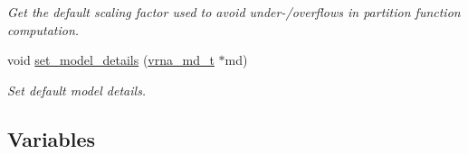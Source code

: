 \begin{DoxyCompactItemize}
\begin{DoxyCompactList}\small\item\em Get the default scaling factor used to avoid under-\//overflows in partition function computation. \end{DoxyCompactList}\item 
void \hyperlink{group__model__details_gabad896c3650d420f3f3ddefc69e2bceb}{set\+\_\+model\+\_\+details} (\hyperlink{group__model__details_ga1f8a10e12a0a1915f2a4eff0b28ea17c}{vrna\+\_\+md\+\_\+t} $\ast$md)
\begin{DoxyCompactList}\small\item\em Set default model details. \end{DoxyCompactList}\end{DoxyCompactItemize}
\subsection*{Variables}

